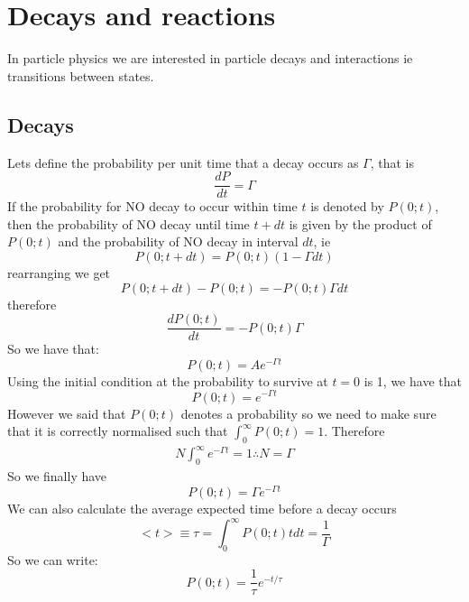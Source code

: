 \section{Decays and reactions}
\label{sec:DecaysAndReaction}
In particle physics we are interested in particle decays and interactions ie transitions between states.
\subsection{Decays}
Lets define the probability per unit time that a decay occurs as $\Gamma$, that is
\begin{equation}
\frac{dP}{dt}=\Gamma
\end{equation}
If the probability for NO decay to occur within time $t$ is denoted by $P(0;t)$, then the probability of NO decay until time $t+dt$ is given by the product of $P(0;t)$ and the probability of NO decay in interval $dt$, ie
\begin{equation}
P(0;t+dt)=P(0;t)(1-\Gamma dt)
\end{equation}
rearranging we get
\begin{equation}
P(0;t+dt)-P(0;t)=-P(0;t)\Gamma dt
\end{equation}
therefore
\begin{equation}
\frac{dP(0;t)}{dt}=-P(0;t)\Gamma
\end{equation}
So we have that:
\begin{equation}
P(0;t)=Ae^{-\Gamma t}
\end{equation}
Using the initial condition at the probability to survive at $t=0$ is 1, we have that 
\begin{equation}
P(0;t)=e^{-\Gamma t}
\end{equation}
However we said that $P(0;t)$ denotes a probability so we need to make sure that it is correctly normalised such that $\int_{0}^{\infty} P(0;t)=1$. Therefore
\begin{eqnarray*}
N\int_{0}^{\infty}e^{-\Gamma t}=1 \therefore
N=\Gamma
\end{eqnarray*}
So we finally have
\begin{equation}
P(0;t)=\Gamma e^{-\Gamma t}
\end{equation}
We can also calculate the average expected time before a decay occurs 
\begin{equation}
<t>\equiv\tau=\int_{0}^{\infty}P(0;t)tdt=\frac{1}{\Gamma}
\end{equation}
So we can write:
\begin{equation}
P(0;t)=\frac{1}{\tau} e^{-t/\tau}
\end{equation}
